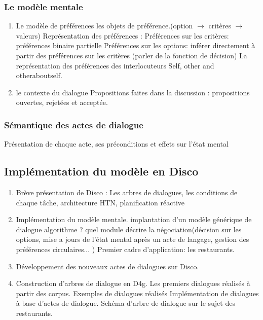 \documentclass[a4paper,french]{article}
\begin{document}
\subsubsection{Le modèle mentale}
\begin{enumerate}
\item Le modèle de préférences
 	\subitem les objets de préférence.(option $\rightarrow$ critères $\rightarrow$ valeurs)
 	\subitem Représentation des préférences :
 			\subsubitem Préférences sur les critères: préférences binaire partielle
 			\subsubitem Préférences sur les options: inférer directement à partir des préférences sur les critères (parler de la fonction de décision)
 	\subitem La représentation des préférences des interlocuteurs
 			\subsubitem Self, other and otheraboutself.
\item le contexte du dialogue
 			\subitem Propositions faites dans la discussion : propositions ouvertes, rejetées et acceptée. 	
\end{enumerate}

\subsubsection{Sémantique des actes de dialogue}
Présentation de chaque acte, ses préconditions et effets sur l'état mental

\subsection{Implémentation du modèle en Disco}
\begin{enumerate}
\item Brève présentation de Disco : Les arbres de dialogues, les conditions de chaque tâche, architecture HTN, planification réactive
\item Implémentation du modèle mentale.	
\subsubitem implantation d'un modèle générique de dialogue
\subsubitem algorithme ? quel module décrire la négociation(décision sur les options, mise a jours de l’état mental après un acte de langage, gestion des préférences circulaires... )
\subsubitem Premier cadre d'application: les restaurants. 
\item Développement des nouveaux actes de dialogues sur Disco. 
\item Construction d'arbres de dialogue en D4g.
\subitem Les premiers dialogues réalisés à partir  des corpus.
\subsubitem Exemples de dialogues réalisés
\subitem Implémentation de dialogues à base d'actes de dialogue. 
\subsubitem Schéma d'arbre de dialogue sur le sujet des restaurants. 
\end{enumerate}
\end{document}
